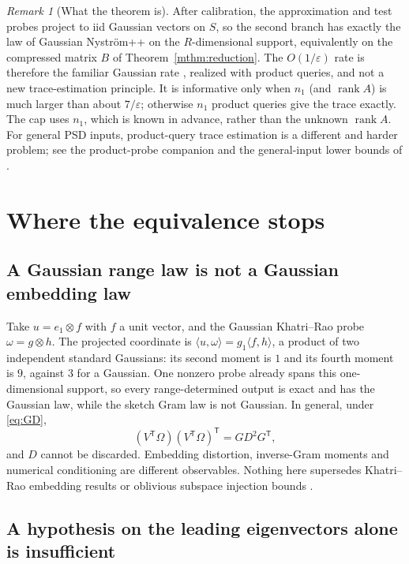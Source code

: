\documentclass[11pt,a4paper]{article}
\theoremstyle{definition}
\theoremstyle{remark}
\newtheorem{remark}[theorem]{Remark}
\numberwithin{equation}{section}
\newcommand{\T}{{\mathsf T}}
\newcommand{\rank}{\operatorname{rank}}
\newcommand{\eps}{\varepsilon}
\begin{document}
\begin{remark}[What the theorem is]
After calibration, the approximation and test probes project to iid Gaussian
vectors on $S$, so the second branch has exactly the law of Gaussian
Nystr\"om++ on the $R$-dimensional support, equivalently on the compressed
matrix $B$ of Theorem~\ref{mthm:reduction}. The $O(1/\eps)$ rate is therefore the
familiar Gaussian rate \cite{Hutchpp,Nyspp}, realized with product queries, and
not a new trace-estimation principle. It is informative only when $n_1$ (and
$\rank A$) is much larger than about $7/\eps$; otherwise $n_1$ product queries
give the trace exactly. The cap uses $n_1$, which is known in advance, rather
than the unknown $\rank A$. For general PSD inputs, product-query trace
estimation is a different and harder problem; see the product-probe companion \cite{PPD} and the general-input lower bounds of \cite{MSW}.
\end{remark}
\section{Where the equivalence stops}\label{sec:limits}

\subsection{A Gaussian range law is not a Gaussian embedding law}

Take $u=e_1\otimes f$ with $f$ a unit vector, and the Gaussian Khatri--Rao
probe $\omega=g\otimes h$. The projected coordinate is
$\langle u,\omega\rangle=g_1\langle f,h\rangle$, a product of two independent
standard Gaussians: its second moment is $1$ and its fourth moment is $9$,
against $3$ for a Gaussian. One nonzero probe already spans this
one-dimensional support, so every range-determined output is exact and has the
Gaussian law, while the sketch Gram law is not Gaussian. In general, under
\eqref{eq:GD},
\[
 (V^\T\Omega)(V^\T\Omega)^\T=GD^2G^\T,
\]
and $D$ cannot be discarded. Embedding distortion, inverse-Gram moments and
numerical conditioning are different observables. Nothing here supersedes
Khatri--Rao embedding results \cite{BM,SVB,BGKL} or oblivious subspace injection
bounds \cite{CEMT}.

\subsection{A hypothesis on the leading eigenvectors alone is insufficient}
\end{document}

